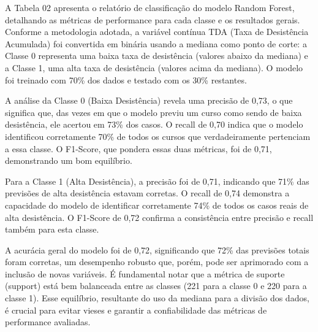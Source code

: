 A Tabela 02 apresenta o relatório de classificação do modelo Random Forest, detalhando as métricas de performance para cada classe e os resultados gerais. Conforme a metodologia adotada, a variável contínua TDA (Taxa de Desistência Acumulada) foi convertida em binária usando a mediana como ponto de corte: a Classe 0 representa uma baixa taxa de desistência (valores abaixo da mediana) e a Classe 1, uma alta taxa de desistência (valores acima da mediana). O modelo foi treinado com 70\% dos dados e testado com os 30\% restantes.

A análise da Classe 0 (Baixa Desistência) revela uma precisão de 0,73, o que significa que, das vezes em que o modelo previu um curso como sendo de baixa desistência, ele acertou em 73\% dos casos. O recall de 0,70 indica que o modelo identificou corretamente 70\% de todos os cursos que verdadeiramente pertenciam a essa classe. O F1-Score, que pondera essas duas métricas, foi de 0,71, demonstrando um bom equilíbrio.

Para a Classe 1 (Alta Desistência), a precisão foi de 0,71, indicando que 71\% das previsões de alta desistência estavam corretas. O recall de 0,74 demonstra a capacidade do modelo de identificar corretamente 74\% de todos os casos reais de alta desistência. O F1-Score de 0,72 confirma a consistência entre precisão e recall também para esta classe.

A acurácia geral do modelo foi de 0,72, significando que 72\% das previsões totais foram corretas, um desempenho robusto que, porém, pode ser aprimorado com a inclusão de novas variáveis. É fundamental notar que a métrica de suporte (support) está bem balanceada entre as classes (221 para a classe 0 e 220 para a classe 1). Esse equilíbrio, resultante do uso da mediana para a divisão dos dados, é crucial para evitar vieses e garantir a confiabilidade das métricas de performance avaliadas.

